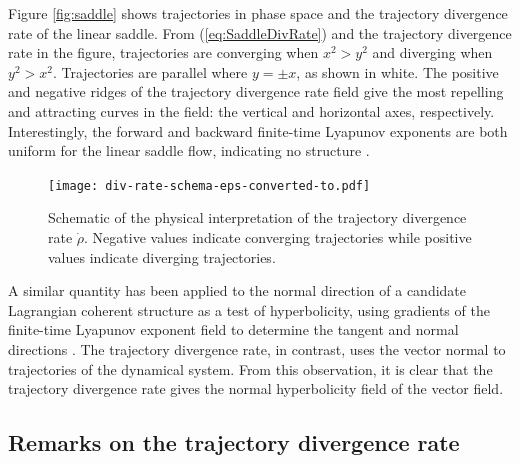 \documentclass[twocolumn]{svjour3}
\begin{document}
Figure \ref{fig:saddle} shows trajectories in phase space and the trajectory divergence rate of the linear saddle. From (\ref{eq:SaddleDivRate}) and the trajectory divergence rate in the figure, trajectories are converging when $x^2>y^2$ and diverging when $y^2>x^2$. Trajectories are parallel where $y=\pm x$, as shown in white. The positive and negative ridges of the trajectory divergence rate field give the most repelling and attracting curves in the field: the vertical and horizontal axes, respectively. Interestingly, the forward and backward finite-time Lyapunov exponents are both uniform for the linear saddle flow, indicating no structure \cite{haller_variational_2011}.

\begin{figure}
\centering
\texttt{[image: div-rate-schema-eps-converted-to.pdf]}
\caption{Schematic of the physical interpretation of the trajectory divergence rate $\dot{\rho}$. Negative values indicate converging trajectories while positive values indicate diverging trajectories.}
\label{fig:DivRateSchema}
\end{figure}

A similar quantity has been applied to the normal direction of a candidate Lagrangian coherent structure as a test of hyperbolicity, using gradients of the finite-time Lyapunov exponent field to determine the tangent and normal directions \cite{green2010using}. The trajectory divergence rate, in contrast, uses the vector normal to trajectories of the dynamical system. From this observation, it is clear that the trajectory divergence rate gives the normal hyperbolicity field of the vector field.

\subsection{Remarks on the trajectory divergence rate}
\end{document}
